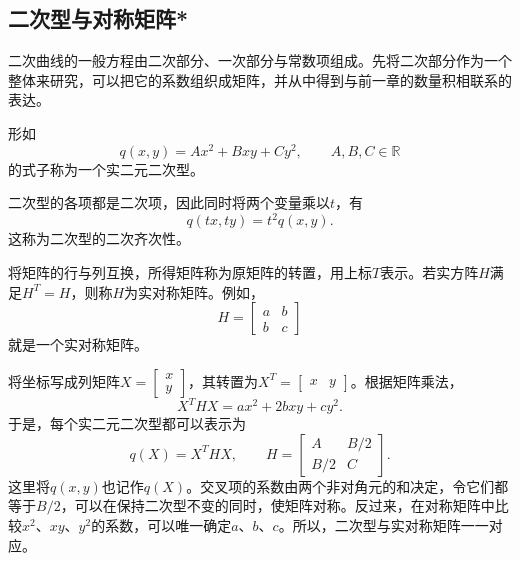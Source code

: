 \newpage
\subsection{二次型与对称矩阵*}
\label{subsec:quadratic-quadratic-forms}

二次曲线的一般方程由二次部分、一次部分与常数项组成。先将二次部分作为一个整体来研究，可以把它的系数组织成矩阵，并从中得到与前一章的数量积相联系的表达。

\begin{definition}\label{def:quadratic-form}
形如
\begin{equation}
    q(x,y) = A x^{2} + B x y + C y^{2} ,
    \qquad A , B , C \in \mathbb{R}
\end{equation}
的式子称为一个{\heiti{}实二元二次型}。
\end{definition}

二次型的各项都是二次项，因此同时将两个变量乘以\(t\)，有
\begin{equation}
    q(tx,ty) = t^{2} q(x,y) .
\end{equation}
这称为二次型的{\heiti{}二次齐次性}。

将矩阵的行与列互换，所得矩阵称为原矩阵的{\heiti{}转置}，用上标\(T\)表示。若实方阵\(H\)满足\(H^{T} = H\)，则称\(H\)为{\heiti{}实对称矩阵}。例如，
\begin{equation}
    H = \left[\begin{matrix}a & b \\ b & c\end{matrix}\right]
\end{equation}
就是一个实对称矩阵。

将坐标写成列矩阵\(X = \left[\begin{matrix}x \\ y\end{matrix}\right]\)，其转置为\(X^{T} = \left[\begin{matrix}x & y\end{matrix}\right]\)。根据矩阵乘法，
\begin{equation}
    X^{T} H X = a x^{2} + 2bxy + c y^{2} .
\end{equation}
于是，每个实二元二次型都可以表示为
\begin{equation}\label{eq:quadratic-matrix-form}
    q(X) = X^{T} H X , \qquad
    H = \left[\begin{matrix}A & B/2 \\ B/2 & C\end{matrix}\right] .
\end{equation}
这里将\(q(x,y)\)也记作\(q(X)\)。交叉项的系数由两个非对角元的和决定，令它们都等于\(B/2\)，可以在保持二次型不变的同时，使矩阵对称。反过来，在对称矩阵中比较\(x^{2}\)、\(xy\)、\(y^{2}\)的系数，可以唯一确定\(a\)、\(b\)、\(c\)。所以，二次型与实对称矩阵一一对应。

